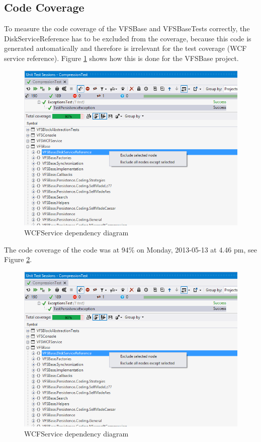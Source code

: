 \documentclass[JCDReport.tex]{subfiles}
\begin{document}
\subsection{Code Coverage}

To measure the code coverage of the VFSBase and VFSBaseTests correctly, the DiskServiceReference has to be excluded from the coverage, because this code is generated automatically and therefore is irrelevant for the test coverage (WCF service reference). Figure \ref{fig:excludeTests} shows how this is done for the VFSBase project.\\

\begin{figure}[h!]
	\centering
	\includegraphics[scale=0.75]{Images/code_coverage1.png} 
	\caption{WCFService dependency diagram}
	\label{fig:excludeTests}
\end{figure}	

The code coverage of the code was at 94\% on Monday, 2013-05-13 at 4.46 pm, see Figure \ref{fig:codeCoverage}.

\begin{figure}[h!]
	\centering
	\includegraphics[scale=0.75]{Images/code_coverage1.png} 
	\caption{WCFService dependency diagram}
	\label{fig:codeCoverage}
\end{figure}	
\end{document}
